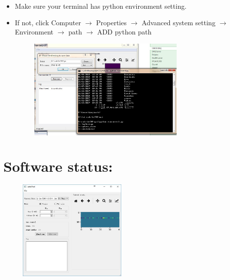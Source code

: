 \documentclass{article}
\begin{document}
\begin{itemize}
\begin{itemize}
                    \item Make sure your terminal has  python environment setting. 
                    \item If not, click Computer $\to$ Properties $\to$ Advanced system setting $\to$ Environment $\to$ path $\to$ ADD python path
                    
                        \begin{figure}[h!]
                        \centering
                        \includegraphics[scale=1.7,height=5cm]{Figures/Open.jpg}
                        \end{figure}
                    
                    
                \end{itemize}
                
            
            
        \end{itemize}
    
\section{Software status:}
    \begin{figure}[h!]
    \centering
    \includegraphics[scale=1.7,height=5cm]{Figures/GUI.jpg}
    \end{figure}
     
\end{document}
